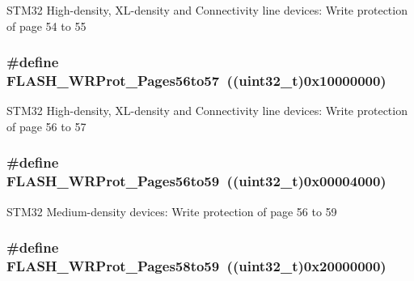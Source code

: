 \label{group__Option__Bytes__Write__Protection_gacd4ea5e6cc3819f40a55a61f3075b626}
STM32 High-\/density, XL-\/density and Connectivity line devices: Write protection of page 54 to 55 \hypertarget{group__Option__Bytes__Write__Protection_ga1779d1131ad245861c61dbf43a2d2d3d}{
\subsubsection[{FLASH\_\-WRProt\_\-Pages56to57}]{\setlength{\rightskip}{0pt plus 5cm}\#define FLASH\_\-WRProt\_\-Pages56to57~((uint32\_\-t)0x10000000)}}
\label{group__Option__Bytes__Write__Protection_ga1779d1131ad245861c61dbf43a2d2d3d}
STM32 High-\/density, XL-\/density and Connectivity line devices: Write protection of page 56 to 57 \hypertarget{group__Option__Bytes__Write__Protection_ga3705c210feeeb63c31976495c0b851f1}{
\subsubsection[{FLASH\_\-WRProt\_\-Pages56to59}]{\setlength{\rightskip}{0pt plus 5cm}\#define FLASH\_\-WRProt\_\-Pages56to59~((uint32\_\-t)0x00004000)}}
\label{group__Option__Bytes__Write__Protection_ga3705c210feeeb63c31976495c0b851f1}
STM32 Medium-\/density devices: Write protection of page 56 to 59 \hypertarget{group__Option__Bytes__Write__Protection_ga4a05bf4eec7521ae90ff662db2a9f4f5}{
\subsubsection[{FLASH\_\-WRProt\_\-Pages58to59}]{\setlength{\rightskip}{0pt plus 5cm}\#define FLASH\_\-WRProt\_\-Pages58to59~((uint32\_\-t)0x20000000)}}
